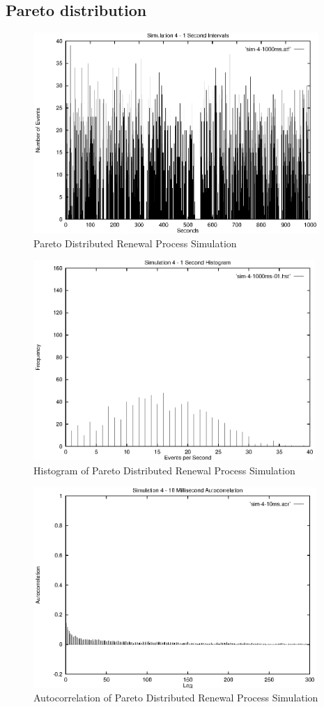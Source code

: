 \subsection{Pareto distribution}

\begin{figure}
\includegraphics[height=3in]{pics/sim-4-1s-freq.eps}
\caption{Pareto Distributed Renewal Process Simulation}
\label{simulation:sim4.1s.freq}
\end{figure}

\begin{figure}
\includegraphics[height=3in]{pics/sim-4-1s-hist-01.eps}
\caption{Histogram of Pareto Distributed Renewal Process Simulation}
\label{simulation:sim4.1s.hist}
\end{figure}

\begin{figure}
\includegraphics[height=3in]{pics/sim-4-10ms-acr.eps}
\caption{Autocorrelation of Pareto Distributed Renewal Process Simulation}
\label{simulation:sim4.10ms.acr}
\end{figure}

